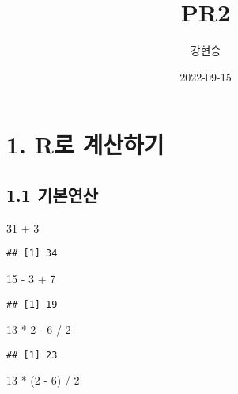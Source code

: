 \documentclass[
]{article}
\title{PR2}
\author{강현승}
\date{2022-09-15}
\newenvironment{Shaded}{\begin{snugshade}}{\end{snugshade}}
\newcommand{\DecValTok}[1]{\textcolor[rgb]{0.00,0.00,0.81}{#1}}
\newcommand{\NormalTok}[1]{#1}
\newcommand{\SpecialCharTok}[1]{\textcolor[rgb]{0.00,0.00,0.00}{#1}}
\begin{document}
\maketitle

\hypertarget{ruxb85c-uxacc4uxc0b0uxd558uxae30}{%
\section{1. R로 계산하기}\label{ruxb85c-uxacc4uxc0b0uxd558uxae30}}

\hypertarget{uxae30uxbcf8uxc5f0uxc0b0}{%
\subsection{1.1 기본연산}\label{uxae30uxbcf8uxc5f0uxc0b0}}

\begin{Shaded}
\begin{Highlighting}[]
\DecValTok{31} \SpecialCharTok{+} \DecValTok{3}
\end{Highlighting}
\end{Shaded}

\begin{verbatim}
## [1] 34
\end{verbatim}

\begin{Shaded}
\begin{Highlighting}[]
\DecValTok{15} \SpecialCharTok{{-}} \DecValTok{3} \SpecialCharTok{+} \DecValTok{7}
\end{Highlighting}
\end{Shaded}

\begin{verbatim}
## [1] 19
\end{verbatim}

\begin{Shaded}
\begin{Highlighting}[]
\DecValTok{13} \SpecialCharTok{*} \DecValTok{2} \SpecialCharTok{{-}} \DecValTok{6} \SpecialCharTok{/} \DecValTok{2}
\end{Highlighting}
\end{Shaded}

\begin{verbatim}
## [1] 23
\end{verbatim}

\begin{Shaded}
\begin{Highlighting}[]
\DecValTok{13} \SpecialCharTok{*}\NormalTok{ (}\DecValTok{2} \SpecialCharTok{{-}} \DecValTok{6}\NormalTok{) }\SpecialCharTok{/} \DecValTok{2}
\end{Highlighting}
\end{Shaded}
\end{document}
